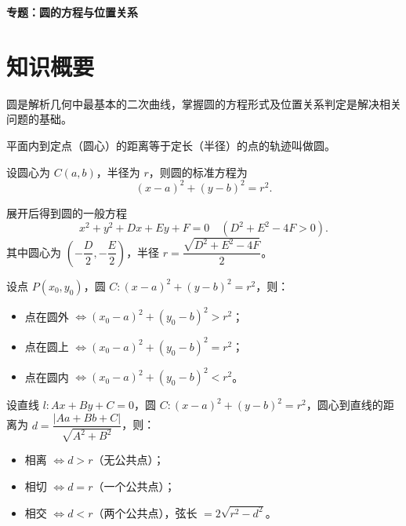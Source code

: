 \documentclass[11pt]{ctexrep}
\begin{document}
\begin{center}
    {\LARGE\bfseries 专题：圆的方程与位置关系}
\end{center}

\section*{知识概要}

圆是解析几何中最基本的二次曲线，掌握圆的方程形式及位置关系判定是解决相关问题的基础。

\begin{definition}[圆的定义]
    平面内到定点（圆心）的距离等于定长（半径）的点的轨迹叫做圆。
    
    设圆心为 $C(a, b)$，半径为 $r$，则圆的标准方程为
    \[
        (x - a)^2 + (y - b)^2 = r^2.
    \]
    
    展开后得到圆的一般方程
    \[
        x^2 + y^2 + Dx + Ey + F = 0 \quad (D^2 + E^2 - 4F > 0).
    \]
    其中圆心为 $\left(-\dfrac{D}{2}, -\dfrac{E}{2}\right)$，半径 $r = \dfrac{\sqrt{D^2 + E^2 - 4F}}{2}$。
\end{definition}

\begin{property}[点与圆的位置关系]
    设点 $P(x_0, y_0)$，圆 $C: (x - a)^2 + (y - b)^2 = r^2$，则：
    \begin{itemize}
        \item 点在圆外 $\Leftrightarrow (x_0 - a)^2 + (y_0 - b)^2 > r^2$；
        \item 点在圆上 $\Leftrightarrow (x_0 - a)^2 + (y_0 - b)^2 = r^2$；
        \item 点在圆内 $\Leftrightarrow (x_0 - a)^2 + (y_0 - b)^2 < r^2$。
    \end{itemize}
\end{property}

\begin{property}[直线与圆的位置关系]
    设直线 $l: Ax + By + C = 0$，圆 $C: (x - a)^2 + (y - b)^2 = r^2$，圆心到直线的距离为 $d = \dfrac{|Aa + Bb + C|}{\sqrt{A^2 + B^2}}$，则：
    \begin{itemize}
        \item 相离 $\Leftrightarrow d > r$（无公共点）；
        \item 相切 $\Leftrightarrow d = r$（一个公共点）；
        \item 相交 $\Leftrightarrow d < r$（两个公共点），弦长 $= 2\sqrt{r^2 - d^2}$。
    \end{itemize}
\end{property}
\end{document}
